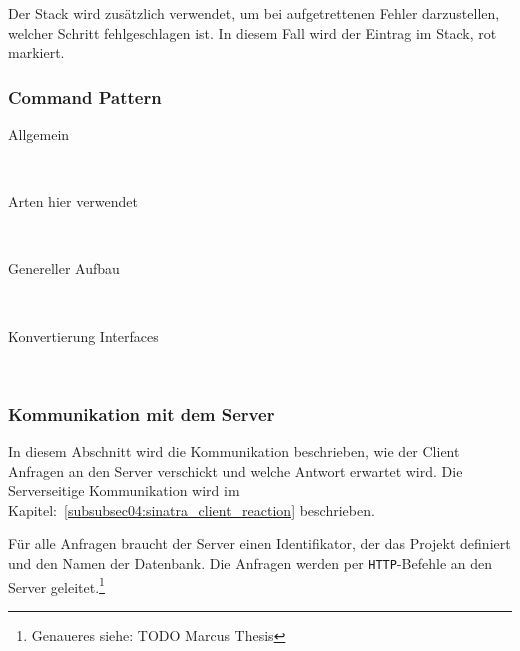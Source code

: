 Der Stack wird zusätzlich verwendet, um bei aufgetrettenen Fehler darzustellen, welcher Schritt fehlgeschlagen ist. In diesem Fall wird der Eintrag im Stack, rot markiert.


\subsubsection{Command Pattern}
\label{subsubsec04:cmd_pattern}

\begin{description}
\item[Allgemein] \hfill\\
\item[Arten hier verwendet] \hfill\\
\item[Genereller Aufbau] \hfill\\
\item[Konvertierung Interfaces] \hfill\\
\end{description}

\subsubsection{Kommunikation mit dem Server}
\label{subsubsec04:kommunikation_cs}
In diesem Abschnitt wird die Kommunikation beschrieben, wie der Client Anfragen an den Server verschickt und welche Antwort erwartet wird.
Die Serverseitige Kommunikation wird im Kapitel:~\ref{subsubsec04:sinatra_client_reaction} beschrieben.

Für alle Anfragen braucht der Server einen Identifikator, der das Projekt definiert und den Namen der Datenbank. Die Anfragen werden per \texttt{HTTP}-Befehle an den Server geleitet.\footnote{Genaueres siehe: TODO Marcus Thesis}%

